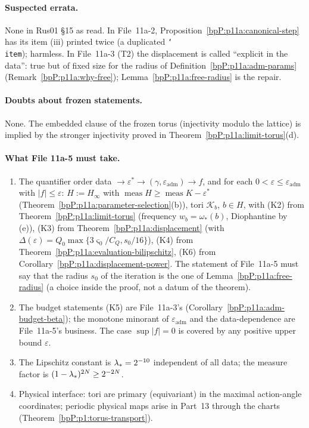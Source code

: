\paragraph{Suspected errata.} None in Rus01 \S15 as read. In File~11a-2, Proposition~\ref{bpP:p11a:canonical-step} has its item (iii) printed twice (a duplicated \texttt{\char`\\item}); harmless. In File~11a-3 (T2) the displacement is called ``explicit in the data'': true but of fixed size for the radius of Definition~\ref{bpP:p11a:adm-params} (Remark~\ref{bpP:p11a:why-free}); Lemma~\ref{bpP:p11a:free-radius} is the repair.

\paragraph{Doubts about frozen statements.} None. The embedded clause of the frozen torus (injectivity modulo the lattice) is implied by the stronger injectivity proved in Theorem~\ref{bpP:p11a:limit-torus}(d).

\paragraph{What File 11a-5 must take.}
\begin{enumerate}[label=(U\arabic*)]
\item The quantifier order data $\to\varepsilon^*\to(\gamma,\varepsilon_{\mathrm{adm}})\to f$, and for each $0<\varepsilon\le\varepsilon_{\mathrm{adm}}$ with $\lvert f\rvert\le\varepsilon$: $H:=H_\infty$ with $\operatorname{meas}H\ge\operatorname{meas}K-\varepsilon^*$ (Theorem~\ref{bpP:p11a:parameter-selection}(b)), tori $\mathcal K_b$, $b\in H$, with (K2) from Theorem~\ref{bpP:p11a:limit-torus} (frequency $w_b=\omega_*(b)$, Diophantine by (e)), (K3) from Theorem~\ref{bpP:p11a:displacement} (with $\Delta(\varepsilon)=Q_0\max\{3\varsigma_0/C_Q,s_0/16\}$), (K4) from Theorem~\ref{bpP:p11a:evaluation-bilipschitz}, (K6) from Corollary~\ref{bpP:p11a:displacement-power}. The statement of File~11a-5 must say that the radius $s_0$ of the iteration is the one of Lemma~\ref{bpP:p11a:free-radius} (a choice inside the proof, not a datum of the theorem).
\item The budget statements (K5) are File~11a-3's (Corollary~\ref{bpP:p11a:adm-budget-beta}); the monotone minorant of $\varepsilon_{\mathrm{adm}}$ and the data-dependence are File~11a-5's business. The case $\sup\lvert f\rvert=0$ is covered by any positive upper bound $\varepsilon$.
\item The Lipschitz constant is $\lambda_{*}=2^{-10}$ independent of all data; the measure factor is $(1-\lambda_{*})^{2N}\ge2^{-2N}$.
\item Physical interface: tori are primary (equivariant) in the maximal action-angle coordinates; periodic physical maps arise in Part~13 through the charts (Theorem~\ref{bpP:p1:torus-transport}).
\end{enumerate}

